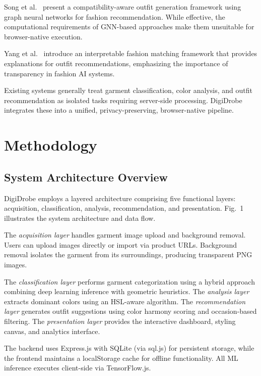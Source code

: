 \documentclass[conference]{IEEEtran}
\begin{document}
Song et al.~\cite{song2023} present a compatibility-aware outfit generation framework using graph neural networks for fashion recommendation. While effective, the computational requirements of GNN-based approaches make them unsuitable for browser-native execution.

Yang et al.~\cite{yang2019} introduce an interpretable fashion matching framework that provides explanations for outfit recommendations, emphasizing the importance of transparency in fashion AI systems.

Existing systems generally treat garment classification, color analysis, and outfit recommendation as isolated tasks requiring server-side processing. DigiDrobe integrates these into a unified, privacy-preserving, browser-native pipeline.

\section{Methodology}

\subsection{System Architecture Overview}

DigiDrobe employs a layered architecture comprising five functional layers: acquisition, classification, analysis, recommendation, and presentation. Fig.~1 illustrates the system architecture and data flow.

The \textit{acquisition layer} handles garment image upload and background removal. Users can upload images directly or import via product URLs. Background removal isolates the garment from its surroundings, producing transparent PNG images.

The \textit{classification layer} performs garment categorization using a hybrid approach combining deep learning inference with geometric heuristics. The \textit{analysis layer} extracts dominant colors using an HSL-aware algorithm. The \textit{recommendation layer} generates outfit suggestions using color harmony scoring and occasion-based filtering. The \textit{presentation layer} provides the interactive dashboard, styling canvas, and analytics interface.

The backend uses Express.js with SQLite (via sql.js) for persistent storage, while the frontend maintains a localStorage cache for offline functionality. All ML inference executes client-side via TensorFlow.js.
\end{document}
